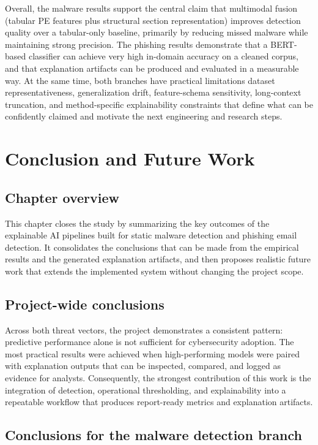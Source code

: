 \documentclass[conference]{IEEEtran}
\begin{document}
Overall, the malware results support the central claim that multimodal fusion (tabular PE features plus structural section representation) improves detection quality over a tabular-only baseline, primarily by reducing missed malware while maintaining strong precision. The phishing results demonstrate that a BERT-based classifier can achieve very high in-domain accuracy on a cleaned corpus, and that explanation artifacts can be produced and evaluated in a measurable way. At the same time, both branches have practical limitations dataset representativeness, generalization drift, feature-schema sensitivity, long-context truncation, and method-specific explainability constraints that define what can be confidently claimed and motivate the next engineering and research steps.

\section{Conclusion and Future Work}

\subsection{Chapter overview}

This chapter closes the study by summarizing the key outcomes of the explainable AI pipelines built for static malware detection and phishing email detection. It consolidates the conclusions that can be made from the empirical results and the generated explanation artifacts, and then proposes realistic future work that extends the implemented system without changing the project scope.

\subsection{Project-wide conclusions}

Across both threat vectors, the project demonstrates a consistent pattern: predictive performance alone is not sufficient for cybersecurity adoption. The most practical results were achieved when high-performing models were paired with explanation outputs that can be inspected, compared, and logged as evidence for analysts. Consequently, the strongest contribution of this work is the integration of detection, operational thresholding, and explainability into a repeatable workflow that produces report-ready metrics and explanation artifacts.

\subsection{Conclusions for the malware detection branch}
\end{document}
